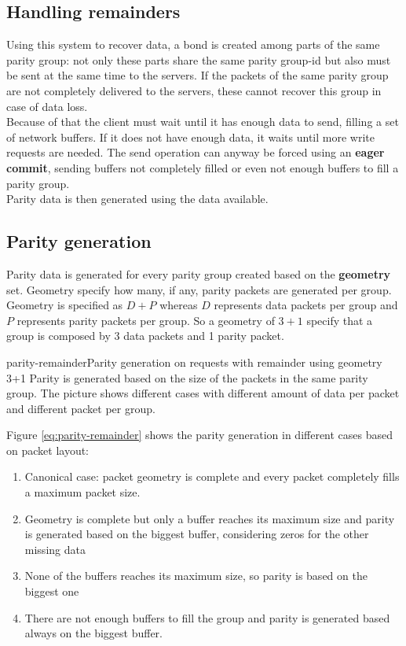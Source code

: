 \subsection{Handling remainders}
Using this system to recover data, a bond is created among parts of the same parity group:
not only these parts share the same parity group-id but also must be sent at the
same time to the servers. If the packets of the same parity group are not
completely delivered to the servers, these cannot recover this group in case of
data loss. \\
Because of that the client must wait until it has enough data to send, filling a set of network buffers. If it does not have
enough data, it waits until more write requests are needed. The send operation can anyway be forced using an
\textbf{eager commit}, sending buffers not completely filled or even not enough buffers to fill a parity group. \\
Parity data is then generated using the data available. \\

\subsection{Parity generation}\label{parity}
Parity data is generated for every parity group created based on the
\textbf{geometry} set. Geometry specify how many, if any, parity packets are
generated per group. Geometry is specified as $D + P$ whereas $D$ represents
data packets per group and $P$ represents parity packets per group. So a
geometry of $3+1$ specify that a group is composed by 3 data packets and 1
parity packet.
\begin{myimage}{parity-remainder}{Parity generation on requests with remainder
    using geometry 3+1}
    Parity is generated based on the size of the packets in the same parity
    group. The picture shows different cases with different amount of data per
    packet and different packet per group.
\end{myimage}
Figure \ref{eq:parity-remainder} shows the parity generation in different cases
based on packet layout:
\begin{enumerate}
    \item Canonical case: packet geometry is complete and every packet
        completely fills a maximum packet size.
    \item Geometry is complete but only a buffer reaches its maximum size and
        parity is generated based on the biggest buffer, considering zeros for
        the other missing data
    \item None of the buffers reaches its maximum size, so parity is based on the biggest one
    \item There are not enough buffers to fill the group and parity is generated based always
        on the biggest buffer.
\end{enumerate}


